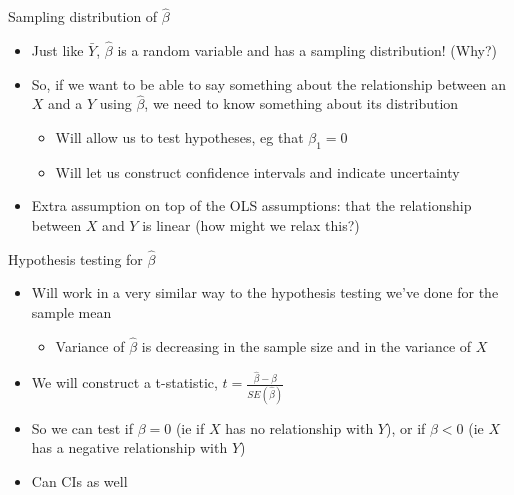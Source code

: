 \documentclass[aspectratio=169]{beamer}
\begin{document}
\begin{frame}{Sampling distribution of $\hat{\beta}$}
    \begin{itemize}
        \item Just like $\bar{Y}$, $\hat{\beta}$ is a random variable and has a sampling distribution! (Why?)
        \item So, if we want to be able to say something about the relationship between an $X$ and a $Y$ using $\hat{\beta}$, we need to know something about its distribution
        \begin{itemize}
            \item Will allow us to test hypotheses, eg that $\beta_1 = 0$
            \item Will let us construct confidence intervals and indicate uncertainty
        \end{itemize}
        \item Extra assumption on top of the OLS assumptions: that the relationship between $X$ and $Y$ is linear (how might we relax this?)
    \end{itemize}
\end{frame}

\begin{frame}{Hypothesis testing for $\hat{\beta}$}
    \begin{itemize}
        \item Will work in a very similar way to the hypothesis testing we've done for the sample mean
        \begin{itemize}
            \item Variance of $\hat{\beta}$ is decreasing in the sample size and in the variance of $X$
        \end{itemize}
        \item We will construct a t-statistic, $t=\frac{\hat{\beta}-\beta}{SE(\hat{\beta})}$
        \item So we can test if $\beta=0$ (ie if $X$ has no relationship with $Y$), or if $\beta<0$ (ie $X$ has a negative relationship with $Y$)
        \item Can CIs as well
    \end{itemize}
\end{frame}
\end{document}
